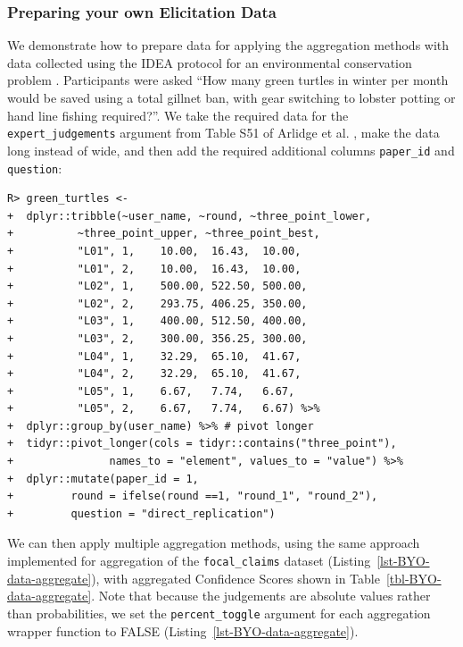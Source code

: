 \documentclass[article]{jss}
\begin{document}
\hypertarget{preparing-your-own-elicitation-data}{%
\subsubsection{Preparing your own Elicitation
Data}\label{preparing-your-own-elicitation-data}}

We demonstrate how to prepare data for applying the 
aggregation methods with data collected using the IDEA protocol for an
environmental conservation problem \citep{Arlidge2020} . Participants
were asked ``How many green turtles in winter per month would be saved
using a total gillnet ban, with gear switching to lobster potting or
hand line fishing required?''. We take the required data for the
\texttt{expert\_judgements} argument from Table S51 of Arlidge et al.
\citeyearpar{Arlidge2020}, make the data long instead of wide, and then
add the required additional columns \texttt{paper\_id} and
\texttt{question}:

\begin{verbatim}
R> green_turtles <- 
+  dplyr::tribble(~user_name, ~round, ~three_point_lower, 
+          ~three_point_upper, ~three_point_best,
+          "L01", 1,    10.00,  16.43,  10.00,
+          "L01", 2,    10.00,  16.43,  10.00,
+          "L02", 1,    500.00, 522.50, 500.00,
+          "L02", 2,    293.75, 406.25, 350.00,
+          "L03", 1,    400.00, 512.50, 400.00,
+          "L03", 2,    300.00, 356.25, 300.00,
+          "L04", 1,    32.29,  65.10,  41.67,
+          "L04", 2,    32.29,  65.10,  41.67,
+          "L05", 1,    6.67,   7.74,   6.67,
+          "L05", 2,    6.67,   7.74,   6.67) %>% 
+  dplyr::group_by(user_name) %>% # pivot longer
+  tidyr::pivot_longer(cols = tidyr::contains("three_point"), 
+               names_to = "element", values_to = "value") %>% 
+  dplyr::mutate(paper_id = 1, 
+         round = ifelse(round ==1, "round_1", "round_2"),
+         question = "direct_replication")
\end{verbatim}

We can then apply multiple aggregation methods, using the same approach
implemented for aggregation of the \texttt{focal\_claims} dataset
(Listing~\ref{lst-BYO-data-aggregate}), with aggregated Confidence
Scores shown in Table~\ref{tbl-BYO-data-aggregate}. Note that because
the judgements are absolute values rather than probabilities, we set the
\texttt{percent\_toggle} argument for each aggregation wrapper function
to {FALSE} (Listing~\ref{lst-BYO-data-aggregate}).
\end{document}
